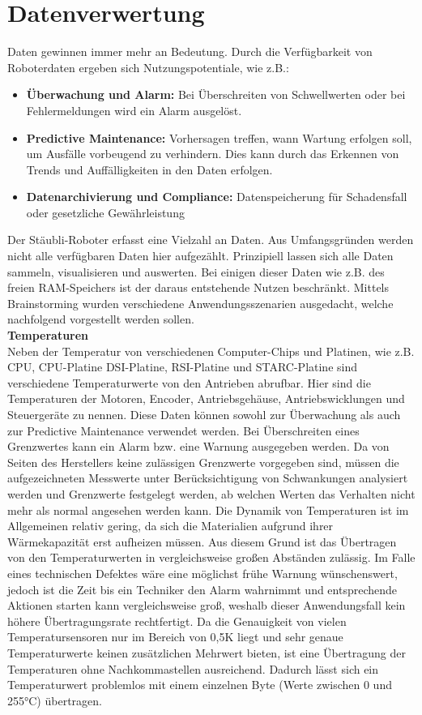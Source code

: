 \documentclass[ a4paper,
                oneside,
                toc=bibliography,
                toc=listof
                ]{scrbook}
\begin{document}
	\section{Datenverwertung}
	Daten gewinnen immer mehr an Bedeutung. Durch die Verfügbarkeit von Roboterdaten ergeben sich Nutzungspotentiale, wie z.B.:
	\begin{itemize}
		\item \textbf{Überwachung und Alarm:} Bei Überschreiten von Schwellwerten oder bei Fehlermeldungen wird ein Alarm ausgelöst.
		\item \textbf{Predictive Maintenance:} Vorhersagen treffen, wann Wartung erfolgen soll, um Ausfälle vorbeugend zu verhindern. Dies kann durch das Erkennen von Trends und Auffälligkeiten in den Daten erfolgen.
		\item \textbf{Datenarchivierung und Compliance:} Datenspeicherung für Schadensfall oder gesetzliche Gewährleistung
	\end{itemize}
	Der Stäubli-Roboter erfasst eine Vielzahl an Daten. Aus Umfangsgründen werden nicht alle verfügbaren Daten hier aufgezählt. Prinzipiell lassen sich alle Daten sammeln, visualisieren und auswerten. Bei einigen dieser Daten wie z.B. des freien RAM-Speichers ist der daraus entstehende Nutzen beschränkt.	Mittels Brainstorming wurden verschiedene Anwendungsszenarien ausgedacht, welche nachfolgend vorgestellt werden sollen.\vspace{0.5\baselineskip}\\
 	\textbf{Temperaturen}\\
 	Neben der Temperatur von verschiedenen Computer-Chips und Platinen, wie z.B. CPU, CPU-Platine DSI-Platine, RSI-Platine und STARC-Platine sind verschiedene Temperaturwerte von den Antrieben abrufbar. Hier sind die Temperaturen der Motoren, Encoder, Antriebsgehäuse,  Antriebswicklungen und  Steuergeräte zu nennen. Diese Daten können sowohl zur Überwachung als auch zur Predictive Maintenance verwendet werden. Bei Überschreiten eines Grenzwertes kann ein Alarm bzw. eine Warnung ausgegeben werden. Da von Seiten des Herstellers keine zulässigen Grenzwerte vorgegeben sind, müssen die aufgezeichneten Messwerte unter Berücksichtigung von Schwankungen analysiert werden und Grenzwerte festgelegt werden, ab welchen Werten das Verhalten nicht mehr als \glqq normal\grqq{} angesehen werden kann. Die Dynamik von Temperaturen ist im Allgemeinen relativ gering, da sich die Materialien aufgrund ihrer Wärmekapazität erst aufheizen müssen. Aus diesem Grund ist das Übertragen von den Temperaturwerten in vergleichsweise großen Abständen zulässig. Im Falle eines technischen Defektes wäre eine möglichst frühe Warnung wünschenswert, jedoch ist die Zeit bis ein Techniker den Alarm wahrnimmt und entsprechende Aktionen starten kann vergleichsweise groß, weshalb dieser Anwendungsfall kein höhere Übertragungsrate rechtfertigt. Da die Genauigkeit von vielen Temperatursensoren nur im Bereich von 0,5K liegt und sehr genaue Temperaturwerte keinen zusätzlichen Mehrwert bieten, ist eine Übertragung der Temperaturen ohne Nachkommastellen ausreichend. Dadurch lässt sich ein Temperaturwert problemlos mit einem einzelnen Byte (Werte zwischen 0 und 255°C) übertragen.\vspace{0.5\baselineskip}\\
\end{document}
